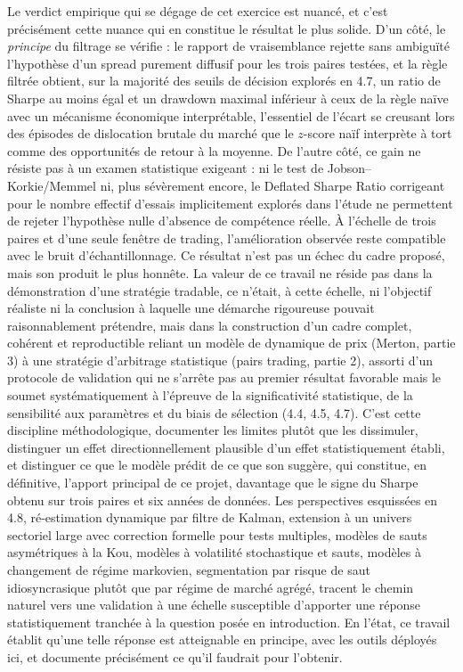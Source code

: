 \documentclass{article}
\begin{document}
Le verdict empirique qui se dégage de cet exercice est nuancé, et c'est précisément cette nuance qui en constitue le résultat le plus solide. D'un côté, le \emph{principe} du filtrage se vérifie : le rapport de vraisemblance rejette sans ambiguïté l'hypothèse d'un spread purement diffusif pour les trois paires testées, et la règle filtrée obtient, sur la majorité des seuils de décision explorés en 4.7, un ratio de Sharpe au moins égal et un drawdown maximal inférieur à ceux de la règle naïve avec un mécanisme économique interprétable, l'essentiel de l'écart se creusant lors des épisodes de dislocation brutale du marché que le $z$-score naïf interprète à tort comme des opportunités de retour à la moyenne. De l'autre côté, ce gain ne résiste pas à un examen statistique exigeant : ni le test de Jobson--Korkie/Memmel ni, plus sévèrement encore, le Deflated Sharpe Ratio corrigeant pour le nombre effectif d'essais implicitement explorés dans l'étude ne permettent de rejeter l'hypothèse nulle d'absence de compétence réelle. À l'échelle de trois paires et d'une seule fenêtre de trading, l'amélioration observée reste compatible avec le bruit d'échantillonnage.
Ce résultat n'est pas un échec du cadre proposé, mais son produit le plus honnête. La valeur de ce travail ne réside pas dans la démonstration d'une stratégie tradable, ce n'était, à cette échelle, ni l'objectif réaliste ni la conclusion à laquelle une démarche rigoureuse pouvait raisonnablement prétendre, mais dans la construction d'un cadre complet, cohérent et reproductible reliant un modèle de dynamique de prix (Merton, partie 3) à une stratégie d'arbitrage statistique (pairs trading, partie 2), assorti d'un protocole de validation qui ne s'arrête pas au premier résultat favorable mais le soumet systématiquement à l'épreuve de la significativité statistique, de la sensibilité aux paramètres et du biais de sélection (4.4, 4.5, 4.7). C'est cette discipline méthodologique, documenter les limites plutôt que les dissimuler, distinguer un effet directionnellement plausible d'un effet statistiquement établi, et distinguer ce que le modèle prédit de ce que son suggère, qui constitue, en définitive, l'apport principal de ce projet, davantage que le signe du Sharpe obtenu sur trois paires et six années de données.
Les perspectives esquissées en 4.8, ré-estimation dynamique par filtre de Kalman, extension à un univers sectoriel large avec correction formelle pour tests multiples, modèles de sauts asymétriques à la Kou, modèles à volatilité stochastique et sauts, modèles à changement de régime markovien, segmentation par risque de saut idiosyncrasique plutôt que par régime de marché agrégé, tracent le chemin naturel vers une validation à une échelle susceptible d'apporter une réponse statistiquement tranchée à la question posée en introduction. En l'état, ce travail établit qu'une telle réponse est atteignable en principe, avec les outils déployés ici, et documente précisément ce qu'il faudrait pour l'obtenir.
\end{document}
